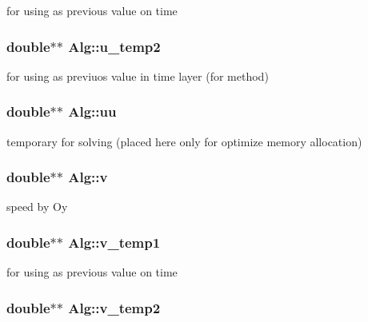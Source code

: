 \label{classAlg_ad60a4d85f33f58e39e026e608d8f3aa3}
for using as previous value on time \hypertarget{classAlg_aa3a0ba123ec36f183c6f878cbc211c7f}{
\subsubsection[{u\_\-temp2}]{\setlength{\rightskip}{0pt plus 5cm}double$\ast$$\ast$ {\bf Alg::u\_\-temp2}}}
\label{classAlg_aa3a0ba123ec36f183c6f878cbc211c7f}
for using as previuos value in time layer (for method) \hypertarget{classAlg_a1ab7953aa405a7f650e000fffa446ca1}{
\subsubsection[{uu}]{\setlength{\rightskip}{0pt plus 5cm}double$\ast$$\ast$ {\bf Alg::uu}}}
\label{classAlg_a1ab7953aa405a7f650e000fffa446ca1}
temporary for solving (placed here only for optimize memory allocation) \hypertarget{classAlg_a47f1cd35f394c7fafac69953e99274e0}{
\subsubsection[{v}]{\setlength{\rightskip}{0pt plus 5cm}double$\ast$$\ast$ {\bf Alg::v}}}
\label{classAlg_a47f1cd35f394c7fafac69953e99274e0}
speed by Oy \hypertarget{classAlg_a060c56407375b51f13bdfed2fe0b1e09}{
\subsubsection[{v\_\-temp1}]{\setlength{\rightskip}{0pt plus 5cm}double$\ast$$\ast$ {\bf Alg::v\_\-temp1}}}
\label{classAlg_a060c56407375b51f13bdfed2fe0b1e09}
for using as previous value on time \hypertarget{classAlg_a1556924bbf451225dca91c36a7b65071}{
\subsubsection[{v\_\-temp2}]{\setlength{\rightskip}{0pt plus 5cm}double$\ast$$\ast$ {\bf Alg::v\_\-temp2}}}
